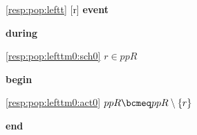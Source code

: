 \noindent \ref{resp:pop:leftt} [r] \textbf{event}
\begin{block}
  \item   \textbf{during}
  \begin{block}
  \item[ \eqref{resp:pop:lefttm0:sch0} ]{$r \in ppR $} %
  \end{block}
  \item   \textbf{begin}
  \begin{block}
  \item[ \eqref{resp:pop:lefttm0:act0} ]{$ppR \bcmeq ppR \setminus \{ r \} $} %
  \end{block}
  \item   \textbf{end} \\
\end{block}
